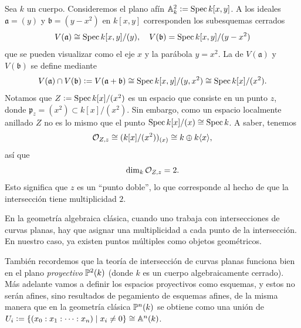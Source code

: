\documentclass{article}
\numberwithin{equation}{section}
\theoremstyle{definition}
\begin{document}
\begin{ejemplo}
  Sea $k$ un cuerpo. Consideremos el plano afín $\mathbb{A}^2_k \mathrel{\mathop:}= \operatorname{Spec} k [x,y]$.
  A los ideales $\mathfrak{a} = (y)$ y $\mathfrak{b} = (y-x^2)$ en $k [x,y]$
  corresponden los subesquemas cerrados
  \[ V (\mathfrak{a}) \cong \operatorname{Spec} k[x,y]/(y), \quad
     V (\mathfrak{b}) = \operatorname{Spec} k [x,y]/(y-x^2) \]
  que se pueden visualizar como el eje $x$ y la parábola $y = x^2$.
  La  de $V (\mathfrak{a})$ y $V (\mathfrak{b})$
  se define mediante
  \[ V (\mathfrak{a}) \cap V (\mathfrak{b}) \mathrel{\mathop:}=
     V (\mathfrak{a} + \mathfrak{b}) \cong
     \operatorname{Spec} k [x,y]/(y,x^2) \cong \operatorname{Spec} k[x]/(x^2). \]
  Notamos que $Z \mathrel{\mathop:}= \operatorname{Spec} k [x]/(x^2)$ es un espacio que consiste en un punto
  $z$, donde $\mathfrak{p}_z = (x^2) \subset k [x]/(x^2)$. Sin embargo, como
  un espacio localmente anillado $Z$ no es lo mismo que el punto
  $\operatorname{Spec} k [x]/(x) \cong \operatorname{Spec} k$. A saber, tenemos
  $$\mathcal{O}_{Z,z} \cong (k [x]/(x^2))_{(x)} \cong k \oplus k \langle x\rangle,$$
  así que
  $$\dim_k \mathcal{O}_{Z,z} = 2.$$
  Esto significa que $z$ es un ``punto doble'', lo que corresponde al hecho
  de que la intersección tiene multiplicidad $2$.

  \begin{center}
  \end{center}

  En la geometría algebraica clásica, cuando uno trabaja con intersecciones
  de curvas planas, hay que asignar una multiplicidad a cada punto
  de la intersección. En nuestro caso, ya existen puntos múltiples como objetos
  geométricos.
\end{ejemplo}

También recordemos que la teoría de intersección de curvas planas funciona bien
en el plano \emph{proyectivo} $\mathbb{P}^2 (k)$ (donde $k$ es un cuerpo
algebraicamente cerrado). Más adelante vamos a definir los espacios proyectivos
como esquemas, y estos no serán afines, sino resultados de pegamiento
de esquemas afines, de la misma manera que en la geometría clásica $\mathbb{P}^n (k)$
se obtiene como una unión de
$U_i \mathrel{\mathop:}= \{ (x_0 : x_1 : \cdots : x_n) \mid x_i \ne 0 \} \cong \mathbb{A}^n (k)$.
\end{document}
